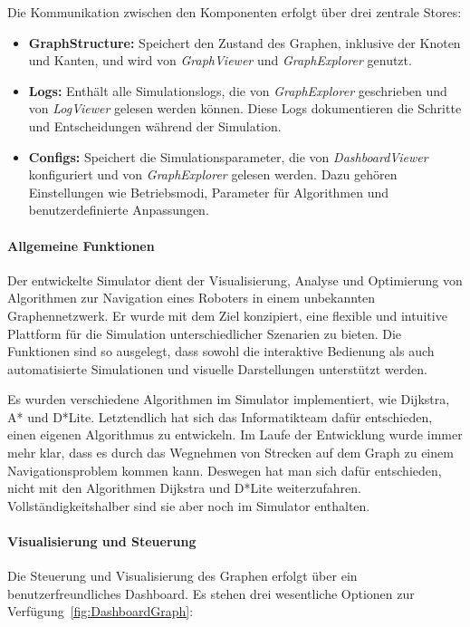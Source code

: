 \documentclass[main.tex]{subfiles} %
\begin{document}
Die Kommunikation zwischen den Komponenten erfolgt über drei zentrale Stores:
\begin{itemize}
    \item \textbf{GraphStructure:} Speichert den Zustand des Graphen, inklusive der Knoten und Kanten, und wird von \textit{GraphViewer} und \textit{GraphExplorer} genutzt.
    \item \textbf{Logs:} Enthält alle Simulationslogs, die von \textit{GraphExplorer} geschrieben und von \textit{LogViewer} gelesen werden können. Diese Logs dokumentieren die Schritte und Entscheidungen während der Simulation.
    \item \textbf{Configs:} Speichert die Simulationsparameter, die von \textit{DashboardViewer} konfiguriert und von \textit{GraphExplorer} gelesen werden. Dazu gehören Einstellungen wie Betriebsmodi, Parameter für Algorithmen und benutzerdefinierte Anpassungen.
\end{itemize}

\paragraph{Allgemeine Funktionen}

Der entwickelte Simulator dient der Visualisierung, Analyse und Optimierung von Algorithmen zur Navigation eines Roboters in einem unbekannten Graphennetzwerk. Er wurde mit dem Ziel konzipiert, eine flexible und intuitive Plattform für die Simulation unterschiedlicher Szenarien zu bieten. Die Funktionen sind so ausgelegt, dass sowohl die interaktive Bedienung als auch automatisierte Simulationen und visuelle Darstellungen unterstützt werden.

Es wurden verschiedene Algorithmen im Simulator implementiert, wie Dijkstra, A* und D*Lite. Letztendlich hat sich das Informatikteam dafür entschieden, einen eigenen Algorithmus zu entwickeln. Im Laufe der Entwicklung wurde immer mehr klar, dass es durch das Wegnehmen von Strecken auf dem Graph zu einem Navigationsproblem kommen kann. Deswegen hat man sich dafür entschieden, nicht mit den Algorithmen Dijkstra und D*Lite weiterzufahren. Vollständigkeitshalber sind sie aber noch im Simulator enthalten.

\paragraph{Visualisierung und Steuerung}

Die Steuerung und Visualisierung des Graphen erfolgt über ein benutzerfreundliches Dashboard. Es stehen drei wesentliche Optionen zur Verfügung~\ref{fig:DashboardGraph}:
\end{document}
